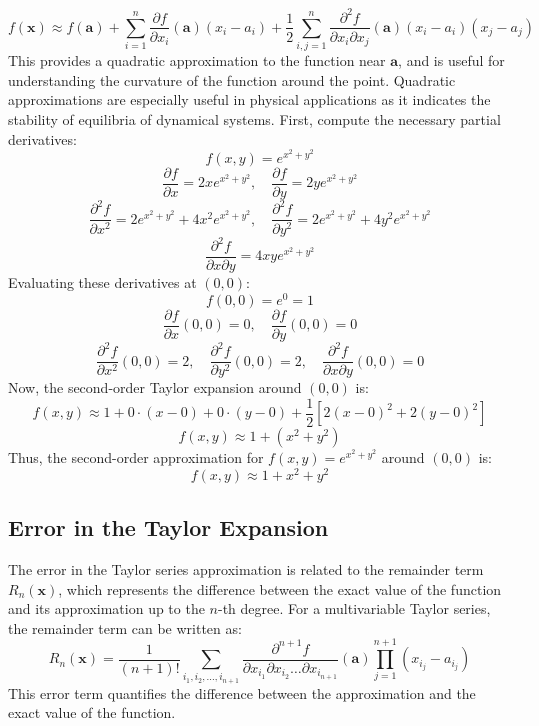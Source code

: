 \[f(\mathbf{x}) \approx f(\mathbf{a}) + \sum_{i=1}^{n} \frac{\partial f}{\partial x_i}(\mathbf{a}) (x_i - a_i) + \frac{1}{2} \sum_{i,j=1}^{n} \frac{\partial^2 f}{\partial x_i \partial x_j} (\mathbf{a}) (x_i - a_i)(x_j - a_j)\]
This provides a quadratic approximation to the function near \( \mathbf{a} \), and is useful for understanding the curvature of the function around the point.
Quadratic approximations are especially useful in physical applications as it indicates the stability of equilibria of dynamical systems.
\noindent First, compute the necessary partial derivatives:
\[f(x, y) = e^{x^2 + y^2}\]
\[\frac{\partial f}{\partial x} = 2x e^{x^2 + y^2}, \quad \frac{\partial f}{\partial y} = 2y e^{x^2 + y^2}\]
\[\frac{\partial^2 f}{\partial x^2} = 2 e^{x^2 + y^2} + 4x^2 e^{x^2 + y^2}, \quad \frac{\partial^2 f}{\partial y^2} = 2 e^{x^2 + y^2} + 4y^2 e^{x^2 + y^2}\]
\[\frac{\partial^2 f}{\partial x \partial y} = 4xy e^{x^2 + y^2}\]
Evaluating these derivatives at \( (0, 0) \):
\[f(0, 0) = e^{0} = 1\]
\[\frac{\partial f}{\partial x}(0, 0) = 0, \quad \frac{\partial f}{\partial y}(0, 0) = 0\]
\[\frac{\partial^2 f}{\partial x^2}(0, 0) = 2, \quad \frac{\partial^2 f}{\partial y^2}(0, 0) = 2, \quad \frac{\partial^2 f}{\partial x \partial y}(0, 0) = 0\]
Now, the second-order Taylor expansion around \( (0, 0) \) is:
\[f(x, y) \approx 1 + 0 \cdot (x - 0) + 0 \cdot (y - 0) + \frac{1}{2} \left[ 2(x - 0)^2 + 2(y - 0)^2 \right]\]
\[f(x, y) \approx 1 + (x^2 + y^2)\]
Thus, the second-order approximation for \( f(x, y) = e^{x^2 + y^2} \) around \( (0, 0) \) is:
\[f(x, y) \approx 1 + x^2 + y^2\]
\subsection{Error in the Taylor Expansion}
\noindent The error in the Taylor series approximation is related to the remainder term \( R_n(\mathbf{x}) \), which represents the difference between the exact value of the function and its approximation up to the \( n \)-th degree. 
For a multivariable Taylor series, the remainder term can be written as:
\[R_n(\mathbf{x}) = \frac{1}{(n+1)!} \sum_{i_1, i_2, \dots, i_{n+1}} \frac{\partial^{n+1} f}{\partial x_{i_1} \partial x_{i_2} \dots \partial x_{i_{n+1}}} (\mathbf{a}) \prod_{j=1}^{n+1} (x_{i_j} - a_{i_j})\]
This error term quantifies the difference between the approximation and the exact value of the function.
